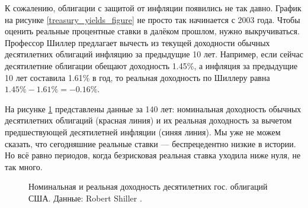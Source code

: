 К сожалению, облигации с защитой от инфляции появились не так давно. График на 
рисунке \ref{treasury_yields_figure} не просто так начинается с 2003 года. 
Чтобы оценить реальные процентные ставки в далёком прошлом, нужно 
выкручиваться. Профессор Шиллер предлагает вычесть из текущей доходности 
обычных десятилетних облигаций инфляцию за предыдущие 10 лет. Например, если 
сейчас десятилетние облигации обещают доходность 1.45\%, а инфляция за 
предыдущие 10 лет составила 1.61\% в год, то реальная доходность по Шиллеру 
равна $1.45\% - 1.61\% = -0.16\%$.

На рисунке \ref{long_run_interest_rates} представлены данные за 140 лет: 
номинальная доходность обычных десятилетних облигаций (красная линия) и их 
реальная доходность за вычетом предшествующей десятилетней инфляции (синяя 
линия). Мы уже не можем сказать, что сегодняшние реальные ставки 
--- беспрецедентно низкие в истории. Но всё равно периодов, когда безрисковая 
реальная ставка уходила ниже нуля, не так много.



\begin{figure}[bt]
\centering
{}
\caption{Номинальная и реальная доходность десятилетних гос. облигаций США. 
Данные: Robert Shiller \cite{shillerOnline}.}
\label{long_run_interest_rates}
\end{figure}

